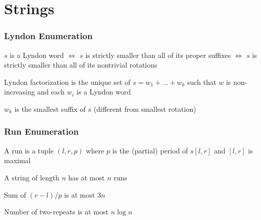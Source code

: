 \chapter{Strings}


\subsection{Lyndon Enumeration}


$s$ is a Lyndon word $\iff$ $s$ is strictly smaller than all of its proper suffixes $\iff$ $s$ is strictly smaller than all of its nontrivial rotations

Lyndon factorization is the unique set of $s = w_1 + ... + w_k$ such that $w$ is non-increasing and each $w_i$ is a Lyndon word

$w_k$ is the smallest suffix of $s$ (different from smallest rotation)

\subsection{Run Enumeration}

A run is a tuple $(l, r, p)$ where $p$ is the (partial) period of $s[l, r]$ and $[l, r]$ is maximal

A string of length $n$ has at most $n$ runs

Sum of $(r - l) / p$ is at most $3n$

Number of two-repeats is at most $n \log n$

